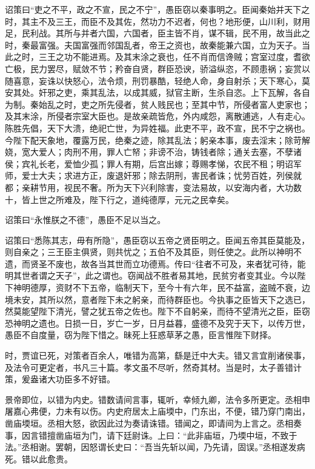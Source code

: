 \documentclass[12pt,UTF8]{ctexbook}
\begin{document}
诏策曰“吏之不平，政之不宣，民之不宁”，愚臣窃以秦事明之。臣闻秦始并天下之时，其主不及三王，而臣不及其佐，然功力不迟者，何也？地形便，山川利，财用足，民利战。其所与并者六国，六国者，臣主皆不肖，谋不辑，民不用，故当此之时，秦最富强。夫国富强而邻国乱者，帝王之资也，故秦能兼六国，立为天子。当此之时，三王之功不能进焉。及其末涂之衰也，任不肖而信谗贼；宫室过度，耆欲亡极，民力罢尽，赋敛不节；矜奋自贤，群臣恐谀，骄溢纵恣，不顾患祸；妄赏以随喜意，妄诛以快怒心，法令烦，刑罚暴酷，轻绝人命，身自射杀；天下寒心，莫安其处。奸邪之吏，乘其乱法，以成其威，狱官主断，生杀自恣。上下瓦解，各自为制。秦始乱之时，吏之所先侵者，贫人贱民也；至其中节，所侵者富人吏家也；及其末涂，所侵者宗室大臣也。是故亲疏皆危，外内咸怨，离散逋逃，人有走心。陈胜先倡，天下大溃，绝祀亡世，为异姓福。此吏不平，政不宣，民不宁之祸也。今陛下配天象地，覆露万民，绝秦之迹，除其乱法；躬亲本事，废去淫末；除苛解娆，宽大爱人；肉刑不用，罪人亡帑；非谤不治，铸钱者除；通关去塞，不孽诸侯；宾礼长老，爱恤少孤；罪人有期，后宫出嫁；尊赐孝悌，农民不租；明诏军师，爱士大夫；求进方正，废退奸邪；除去阴刑，害民者诛；忧劳百姓，列侯就都；亲耕节用，视民不奢。所为天下兴利除害，变法易故，以安海内者，大功数十，皆上世之所难及，陛下行之，道纯德厚，元元之民幸矣。



诏策曰“永惟朕之不德”，愚臣不足以当之。



诏策曰“悉陈其志，毋有所隐”，愚臣窃以五帝之贤臣明之。臣闻五帝其臣莫能及，则自亲之；三王臣主俱贤，则共忧之；五伯不及其臣，则任使之。此所以神明不遗，而贤圣不废也，故各当其世而立功德焉。传曰“往者不可及，来者犹可待，能明其世者谓之天子”，此之谓也。窃闻战不胜者易其地，民贫穷者变其业。今以陛下神明德厚，资财不下五帝，临制天下，至今十有六年，民不益富，盗贼不衰，边境未安，其所以然，意者陛下未之躬亲，而待群臣也。今执事之臣皆天下之选已，然莫能望陛下清光，譬之犹五帝之佐也。陛下不自躬亲，而待不望清光之臣，臣窃恐神明之遗也。日损一日，岁亡一岁，日月益暮，盛德不及究于天下，以传万世，愚臣不自度量，窃为陛下惜之。昧死上狂惑草茅之愚，臣言惟陛下财择。



时，贾谊已死，对策者百余人，唯错为高第，繇是迁中大夫。错又言宜削诸侯事，及法令可更定者，书凡三十篇。孝文虽不尽听，然奇其材。当是时，太子善错计策，爰盎诸大功臣多不好错。



景帝即位，以错为内史。错数请间言事，辄听，幸倾九卿，法令多所更定。丞相申屠嘉心弗便，力未有以伤。内史府居太上庙堧中，门东出，不便，错乃穿门南出，凿庙堧垣。丞相大怒，欲因此过为奏请诛错。错闻之，即请间为上言之。丞相奏事，因言错擅凿庙垣为门，请下廷尉诛。上曰：“此非庙垣，乃堧中垣，不致于法。”丞相谢。罢朝，因怒谓长史曰：“吾当先斩以闻，乃先请，固误。”丞相遂发病死。错以此愈贵。
\end{document}
